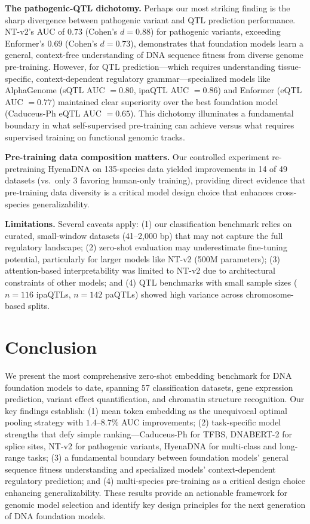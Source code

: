 \documentclass[11pt]{article}
\begin{document}
\textbf{The pathogenic-QTL dichotomy.} Perhaps our most striking finding is the sharp divergence between pathogenic variant and QTL prediction performance. NT-v2's AUC of $0.73$ (Cohen's $d = 0.88$) for pathogenic variants, exceeding Enformer's $0.69$ (Cohen's $d = 0.73$), demonstrates that foundation models learn a general, context-free understanding of DNA sequence fitness from diverse genome pre-training. However, for QTL prediction---which requires understanding tissue-specific, context-dependent regulatory grammar---specialized models like AlphaGenome (sQTL AUC $= 0.80$, ipaQTL AUC $= 0.86$) and Enformer (eQTL AUC $= 0.77$) maintained clear superiority over the best foundation model (Caduceus-Ph eQTL AUC $= 0.65$). This dichotomy illuminates a fundamental boundary in what self-supervised pre-training can achieve versus what requires supervised training on functional genomic tracks.

\textbf{Pre-training data composition matters.} Our controlled experiment re-pretraining HyenaDNA on 135-species data yielded improvements in 14 of 49 datasets (vs.\ only 3 favoring human-only training), providing direct evidence that pre-training data diversity is a critical model design choice that enhances cross-species generalizability.

\textbf{Limitations.} Several caveats apply: (1) our classification benchmark relies on curated, small-window datasets (41--2,000 bp) that may not capture the full regulatory landscape; (2) zero-shot evaluation may underestimate fine-tuning potential, particularly for larger models like NT-v2 (500M parameters); (3) attention-based interpretability was limited to NT-v2 due to architectural constraints of other models; and (4) QTL benchmarks with small sample sizes ($n = 116$ ipaQTLs, $n = 142$ paQTLs) showed high variance across chromosome-based splits.

\section{Conclusion}

We present the most comprehensive zero-shot embedding benchmark for DNA foundation models to date, spanning 57 classification datasets, gene expression prediction, variant effect quantification, and chromatin structure recognition. Our key findings establish: (1) mean token embedding as the unequivocal optimal pooling strategy with $1.4$--$8.7\%$ AUC improvements; (2) task-specific model strengths that defy simple ranking---Caduceus-Ph for TFBS, DNABERT-2 for splice sites, NT-v2 for pathogenic variants, HyenaDNA for multi-class and long-range tasks; (3) a fundamental boundary between foundation models' general sequence fitness understanding and specialized models' context-dependent regulatory prediction; and (4) multi-species pre-training as a critical design choice enhancing generalizability. These results provide an actionable framework for genomic model selection and identify key design principles for the next generation of DNA foundation models.



\end{document}
